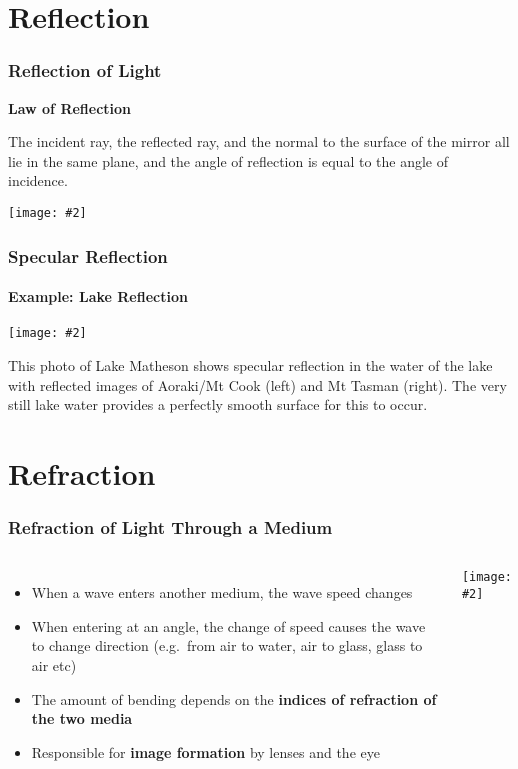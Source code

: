 \documentclass[compress,aspectratio=169]{beamer}
\newcommand{\pic}[2]{\texttt{[image: \#2]}}
\begin{document}
\section{Reflection}
\begin{frame}
  \frametitle{Reflection of Light}
  \textbf{Law of Reflection}
  
  The incident ray, the reflected ray, and the normal to the surface of the
  mirror all lie in the same plane, and the angle of reflection is equal to
  the angle of incidence.  
  \begin{center}
    \pic{0.7}{graphics/Types-of-reflection.jpg}
  \end{center}
\end{frame}


\begin{frame}
  \frametitle{Specular Reflection}
  \framesubtitle{Example: Lake Reflection}
  \begin{center}
    \pic{0.55}{graphics/Lake-reflection.jpg}
  \end{center}
  This photo of Lake Matheson shows specular reflection in the water of the
  lake with reflected images of Aoraki/Mt Cook (left) and Mt Tasman (right).
  The very still lake water provides a perfectly smooth surface for this to
  occur.
\end{frame}



\section{Refraction}

\begin{frame}
  \frametitle{Refraction of Light Through a Medium}
  \begin{columns}
    \begin{itemize}
    \item When a wave enters another medium, the wave speed changes
    \item When entering at an angle, the change of speed causes the wave to
      change direction (e.g.\ from air to water, air to glass, glass to air etc)
    \item The amount of bending depends on the
      \textbf{indices of refraction of the two media}
    \item Responsible for \textbf{image formation} by lenses and the eye
    \end{itemize}
    \pic{1}{graphics/negative_refraction.jpg}
  \end{columns}
\end{frame}
\end{document}
